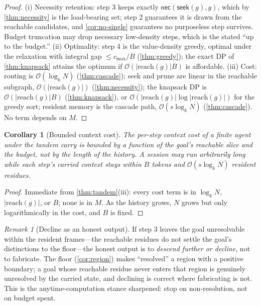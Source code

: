 \documentclass[11pt,a4paper]{article}
\theoremstyle{thmstyle}
\newtheorem{corollary}[theorem]{Corollary}
\theoremstyle{definition}
\theoremstyle{remark}
\newtheorem{remark}[theorem]{Remark}
\newcommand{\goal}{g}                   %
\newcommand{\reach}{\mathrm{reach}}
\newcommand{\budget}{B}
\newcommand{\seek}{\textsf{seek}}
\newcommand{\nec}{\textsf{nec}}
\newcommand{\cost}{c}                   %
\newcommand{\abs}[1]{\lvert#1\rvert}
\begin{document}
\begin{proof}
(i) Necessity retention: step 3 keeps exactly $\nec(\seek(\goal),\goal)$, which by
\cref{thm:necessity} is the load-bearing set; step 2 guarantees it is drawn from
the reachable candidates, and \cref{cor:no-single} guarantees no purposeless step
survives. Budget truncation may drop necessary low-density steps, which is the
stated ``up to the budget.''
(ii) Optimality: step 4 is the value-density greedy, optimal under the relaxation
with integral gap $\le\cost_{\max}/\budget$ (\cref{thm:greedy}); the exact DP of
\cref{thm:knapsack} attains the optimum if $\mathcal{O}(\abs{\reach(\goal)}\budget)$
is affordable.
(iii) Cost: routing is $\mathcal{O}(\log_k N)$ (\cref{thm:cascade}); seek and
prune are linear in the reachable subgraph, $\mathcal{O}(\abs{\reach(\goal)})$
(\cref{thm:necessity}); the knapsack DP is
$\mathcal{O}(\abs{\reach(\goal)}\budget)$ (\cref{thm:knapsack}), or
$\mathcal{O}(\abs{\reach(\goal)}\log\abs{\reach(\goal)})$ for the greedy sort;
resident memory is the cascade path, $\mathcal{O}(s\log_k N)$ (\cref{thm:cascade}).
No term depends on $M$.
\end{proof}

\begin{corollary}[Bounded context cost]
\label{cor:bounded}
The per-step context cost of a finite agent under the tandem carry is bounded by
a function of the goal's reachable slice and the budget, not by the length of the
history. A session may run arbitrarily long while each step's carried context
stays within $\budget$ tokens and $\mathcal{O}(s\log_k N)$ resident residues.
\end{corollary}

\begin{proof}
Immediate from \cref{thm:tandem}(iii): every cost term is in $\log_k N$,
$\abs{\reach(\goal)}$, or $\budget$; none is in $M$. As the history grows, $N$
grows but only logarithmically in the cost, and $\budget$ is fixed.
\end{proof}

\begin{remark}[Decline as an honest output]
\label{rem:decline}
If step 3 leaves the goal unresolvable within the resident frames---the reachable
residues do not settle the goal's distinctions to the floor---the honest output
is to \emph{descend further or decline}, not to fabricate. The floor
(\cref{cor:region}) makes ``resolved'' a region with a positive boundary; a goal
whose reachable residue never enters that region is genuinely unresolved by the
carried state, and declining is correct where fabricating is not. This is the
anytime-computation stance \citep{dean1988,zilberstein1996} sharpened: stop on
non-resolution, not on budget spent.
\end{remark}
\end{document}
